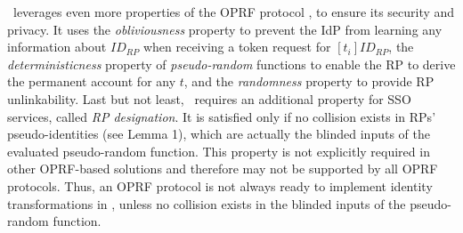 


\usso\ leverages even more properties of the OPRF protocol \cite{oprf-proved,voprf-proved}, %
 to ensure its security and privacy. %
It uses the \emph{obliviousness} property to prevent the IdP from learning any information about $ID_{RP}$ when receiving a token request for $[t_i]ID_{RP}$, the \emph{deterministicness} property of \emph{pseudo-random} functions to enable the RP to derive the permanent account for any $t$,
and the \emph{randomness} property to provide RP unlinkability.
Last but not least, \usso\ requires an additional property for SSO services, called \emph{RP designation}.
It is satisfied only if no collision exists in RPs' pseudo-identities (see Lemma 1), which are actually the blinded inputs of the evaluated pseudo-random function.
This property   %
is not explicitly required in other OPRF-based solutions and therefore may not be supported by all OPRF protocols.
Thus, an OPRF protocol is not always ready to implement identity transformations in \usso, unless no collision exists in the blinded inputs of the pseudo-random function.